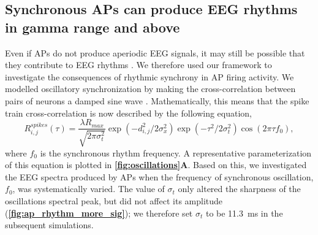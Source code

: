 \subsection{Synchronous APs can produce EEG rhythms in gamma range and above}
Even if APs do not produce aperiodic EEG signals, it may still be possible that they contribute to EEG rhythms \cite{Thio2023}. We therefore used our framework to investigate the consequences of rhythmic synchrony in AP firing activity. We modelled oscillatory synchronization by making the cross-correlation between pairs of neurons a damped sine wave \cite{Engel1990, Engel1991}. Mathematically, this means that the spike train cross-correlation is now described by the following equation,
\begin{equation} \label{eq:rhythmic_synchrony}
    R^{spikes}_{i,j}(\tau) = \frac{\lambda R_{max}}{\sqrt{2\pi \sigma_t^2}} \exp(-d_{i,j}^2 / 2\sigma_x^2) \exp(-\tau^2/2\sigma_t^2) \cos(2\pi\tau f_0),
\end{equation} 
where $f_0$ is the synchronous rhythm frequency. A representative parameterization of this equation is plotted in \textbf{\autoref{fig:oscillations}A}. Based on this, we investigated the EEG spectra produced by APs when the frequency of synchronous oscillation, $f_0$, was systematically varied. The value of $\sigma_t$ only altered the sharpness of the oscillations spectral peak, but did not affect its amplitude  (\textbf{\autoref{fig:ap_rhythm_more_sig}}); we therefore set $\sigma_t$ to be 11.3~\unit{\milli\second} in the subsequent simulations.

